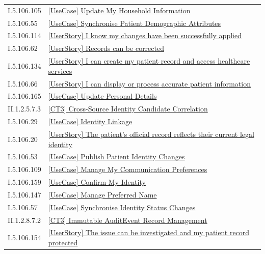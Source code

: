 \begin{longtable}{p{.22\linewidth}p{.73\linewidth}}
I.5.106.105 & \hyperref[element:5c4e46fd2e06468c9e9bc523e2dfd886]{[UseCase] Update My Household Information} \\
I.5.106.55 & \hyperref[element:5c9461b6dc5e4c549ba92dc86e7f4a1c]{[UseCase] Synchronise Patient Demographic Attributes} \\
I.5.106.114 & \hyperref[element:5e28bd3774c04713b84d8432d96074a7]{[UserStory] I know my changes have been successfully applied} \\
I.5.106.62 & \hyperref[element:5eb72d5e9211419b8cbda74d8c385d1e]{[UserStory] Records can be corrected} \\
I.5.106.134 & \hyperref[element:5ee3ccb3d190493980140205acac5465]{[UserStory] I can create my patient record and access healthcare services} \\
I.5.106.66 & \hyperref[element:5f93e077800e4057832a7c699c7e1ebb]{[UserStory] I can display or process accurate patient information} \\
I.5.106.165 & \hyperref[element:5f9cbfb8197a4111919fb1d587b4e88f]{[UseCase] Update Personal Details} \\
II.1.2.5.7.3 & \hyperref[element:60d97cd46fde4349864aa737526f08cb]{[CT3] Cross-Source Identity Candidate Correlation} \\
I.5.106.29 & \hyperref[element:657b4bc97cbb4baea9cf15236558b040]{[UseCase] Identity Linkage} \\
I.5.106.20 & \hyperref[element:66ae8d587c2f4eb8bfbe5c647bb39ad2]{[UserStory] The patient's official record reflects their current legal identity} \\
I.5.106.53 & \hyperref[element:67a2139872aa47da9650a100cf5e869b]{[UseCase] Publish Patient Identity Changes} \\
I.5.106.109 & \hyperref[element:6837c7a302a74f62a498f48314a185ba]{[UseCase] Manage My Communication Preferences} \\
I.5.106.159 & \hyperref[element:6b3f4ae41ad243f9b7bc479970bf6aae]{[UseCase] Confirm My Identity} \\
I.5.106.147 & \hyperref[element:6ddba5493f1d48f9930e9909e968ea0b]{[UseCase] Manage Preferred Name} \\
I.5.106.57 & \hyperref[element:6fcc3cf4bddd4aea824ce015921952d0]{[UseCase] Synchronise Identity Status Changes} \\
II.1.2.8.7.2 & \hyperref[element:70e9f760ebd34045b8dd92f31fb8a00b]{[CT3] Immutable AuditEvent Record Management} \\
I.5.106.154 & \hyperref[element:753c615ef14848919909618cd650719b]{[UserStory] The issue can be investigated and my patient record protected} \\

\end{longtable}

